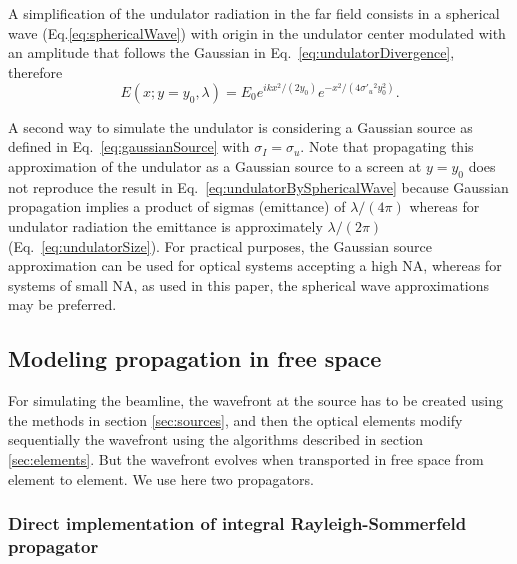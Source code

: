 \documentclass{iucr}
\begin{document}
A  simplification of the undulator radiation in the far field consists in a spherical wave (Eq.\ref{eq:sphericalWave}) with origin in the undulator center modulated with an amplitude that follows the Gaussian in Eq.~\ref{eq:undulatorDivergence}, therefore
\begin{equation}
    \label{eq:undulatorBySphericalWave}
    E(x;y=y_0,\lambda) = E_0 e^{i k x^2 / (2 y_0)} e^{-x^2/(4 \sigma'_u{}^2 y_0^2)}.
\end{equation}

A second way to simulate the undulator is considering a Gaussian source as defined in Eq.~\ref{eq:gaussianSource} with $\sigma_I=\sigma_u$. Note that propagating this approximation of the undulator as a Gaussian source to a screen at $y=y_0$ does not reproduce the result in Eq.~\ref{eq:undulatorBySphericalWave} because Gaussian propagation implies a product of sigmas (emittance) of $\lambda / (4 \pi)$ whereas for undulator radiation the emittance is approximately $\lambda / (2 \pi)$ (Eq.~\ref{eq:undulatorSize}). For practical purposes, the Gaussian source approximation can be used for optical systems accepting a high NA, whereas for systems of small NA, as used in this paper, the spherical wave approximations may be preferred.


\subsection{Modeling propagation in free space}
\label{sec:propagation}

For simulating the beamline, the wavefront at the source has to be created using the methods in section  \ref{sec:sources}, and then the optical elements modify sequentially the wavefront using the algorithms described in section \ref{sec:elements}.  But the wavefront evolves when transported in free space from element to element. We use here two propagators. 

\subsubsection{Direct implementation of integral Rayleigh-Sommerfeld propagator}
\label{sec:integralPropagator}
\end{document}

